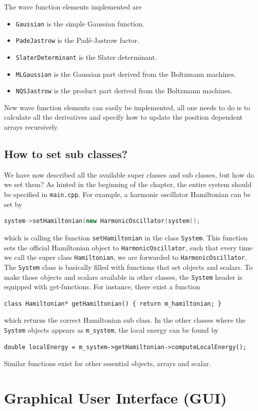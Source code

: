 The wave function elements implemented are 
\begin{itemize}
	\item \texttt{Gaussian} is the simple Gaussian function.
	\item \texttt{PadeJastrow} is the Padé-Jastrow factor.
	\item \texttt{SlaterDeterminant} is the Slater determinant.
	\item \texttt{MLGaussian} is the Gaussian part derived from the Boltzmann machines.
	\item \texttt{NQSJastrow} is the product part derived from the Boltzmann machines. 
\end{itemize}

New wave function elements can easily be implemented, all one needs to do is to calculate all the derivatives and specify how to update the position dependent arrays recursively. 

\subsection{How to set sub classes?}
We have now described all the available super classes and sub classes, but how do we set them? As hinted in the beginning of the chapter, the entire system should be specified in \texttt{main.cpp}. For example, a harmonic oscillator Hamiltonian can be set by
\begin{lstlisting}[language=c++]
system->setHamiltonian(new HarmonicOscillator(system));
\end{lstlisting}
which is calling the function \texttt{setHamiltonian} in the class \texttt{System}. This function sets the official Hamiltonian object to \texttt{HarmonicOscillator}, such that every time we call the super class \texttt{Hamiltonian}, we are forwarded to \texttt{HarmonicOscillator}. The \texttt{System} class is basically filled with functions that set objects and scalars. To make those objects and scalars available in other classes, the \texttt{System} header is equipped with get-functions. For instance, there exist a function 
\begin{lstlisting}
class Hamiltonian* getHamiltonian() { return m_hamiltonian; }
\end{lstlisting}
which returns the correct Hamiltonian sub class. In the other classes where the \texttt{System} objects appears as \texttt{m\_system}, the local energy can be found by
\begin{lstlisting}
double localEnergy = m_system->getHamiltonian->computeLocalEnergy();
\end{lstlisting}
Similar functions exist for other essential objects, arrays and scalar. 

\section{Graphical User Interface (GUI)}
